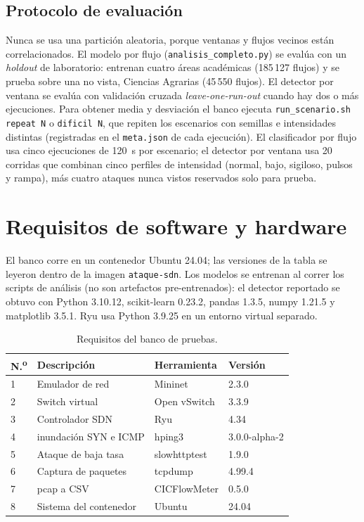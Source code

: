 \documentclass[a4paper,fleqn]{cas-dc}
\begin{document}
\subsection{Protocolo de evaluación}
Nunca se usa una partición aleatoria, porque ventanas y flujos vecinos están correlacionados. El modelo por flujo (\texttt{analisis\_completo.py}) se evalúa con un \emph{holdout} de laboratorio: entrenan cuatro áreas académicas (185\,127 flujos) y se prueba sobre una no vista, Ciencias Agrarias (45\,550 flujos). El detector por ventana se evalúa con validación cruzada \emph{leave-one-run-out} cuando hay dos o más ejecuciones. Para obtener media y desviación el banco ejecuta \texttt{run\_scenario.sh repeat N} o \texttt{dificil N}, que repiten los escenarios con semillas e intensidades distintas (registradas en el \texttt{meta.json} de cada ejecución). El clasificador por flujo usa cinco ejecuciones de 120~s por escenario; el detector por ventana usa 20 corridas que combinan cinco perfiles de intensidad (normal, bajo, sigiloso, pulsos y rampa), más cuatro ataques nunca vistos reservados solo para prueba.


\section{Requisitos de software y hardware}\label{sec:requirements}

El banco corre en un contenedor Ubuntu 24.04; las versiones de la tabla se leyeron dentro de la imagen \texttt{ataque-sdn}. Los modelos se entrenan al correr los scripts de análisis (no son artefactos pre-entrenados): el detector reportado se obtuvo con Python 3.10.12, scikit-learn 0.23.2, pandas 1.3.5, numpy 1.21.5 y matplotlib 3.5.1. Ryu usa Python 3.9.25 en un entorno virtual separado.

\begin{table}[H]
      \footnotesize
      \caption{Requisitos del banco de pruebas.}\label{tbl:testbed}
      
      \begin{tabular}{@{}p{0.5cm}p{2.3cm}p{1.7cm}p{1.6cm}@{}}
            \toprule
            N.\textsuperscript{o} & Descripción & Herramienta & Versión \\
            \midrule
            1 & Emulador de red & Mininet & 2.3.0 \\
            2 & Switch virtual & Open vSwitch & 3.3.9 \\
            3 & Controlador SDN & Ryu & 4.34 \\
            4 & inundación SYN e ICMP & hping3 & 3.0.0-alpha-2 \\
            5 & Ataque de baja tasa & slowhttptest & 1.9.0 \\
            6 & Captura de paquetes & tcpdump & 4.99.4 \\
            7 & pcap a CSV & CICFlowMeter & 0.5.0 \\
            8 & Sistema del contenedor & Ubuntu & 24.04 \\
            \bottomrule
      \end{tabular}
\end{table}
\end{document}
